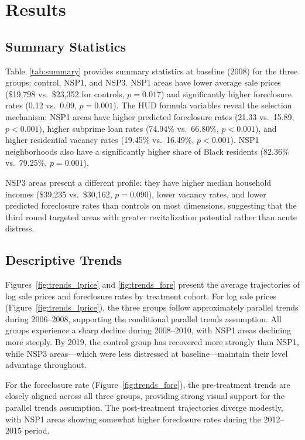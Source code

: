 \documentclass[12pt,authoryear]{elsarticle}
\begin{document}
\section{Results}
\label{sec:results}

\subsection{Summary Statistics}

Table~\ref{tab:summary} provides summary statistics at baseline (2008) for the three groups: control, NSP1, and NSP3. NSP1 areas have lower average sale prices (\$19,798 vs.\ \$23,352 for controls, $p = 0.017$) and significantly higher foreclosure rates (0.12 vs.\ 0.09, $p = 0.001$). The HUD formula variables reveal the selection mechanism: NSP1 areas have higher predicted foreclosure rates (21.33 vs.\ 15.89, $p < 0.001$), higher subprime loan rates (74.94\% vs.\ 66.80\%, $p < 0.001$), and higher residential vacancy rates (19.45\% vs.\ 16.49\%, $p < 0.001$). NSP1 neighborhoods also have a significantly higher share of Black residents (82.36\% vs.\ 79.25\%, $p = 0.001$).

NSP3 areas present a different profile: they have higher median household incomes (\$39,235 vs.\ \$30,162, $p = 0.090$), lower vacancy rates, and lower predicted foreclosure rates than controls on most dimensions, suggesting that the third round targeted areas with greater revitalization potential rather than acute distress.

\subsection{Descriptive Trends}

Figures~\ref{fig:trends_lprice} and \ref{fig:trends_fore} present the average trajectories of log sale prices and foreclosure rates by treatment cohort. For log sale prices (Figure~\ref{fig:trends_lprice}), the three groups follow approximately parallel trends during 2006--2008, supporting the conditional parallel trends assumption. All groups experience a sharp decline during 2008--2010, with NSP1 areas declining more steeply. By 2019, the control group has recovered more strongly than NSP1, while NSP3 areas---which were less distressed at baseline---maintain their level advantage throughout.

For the foreclosure rate (Figure~\ref{fig:trends_fore}), the pre-treatment trends are closely aligned across all three groups, providing strong visual support for the parallel trends assumption. The post-treatment trajectories diverge modestly, with NSP1 areas showing somewhat higher foreclosure rates during the 2012--2015 period.
\end{document}
